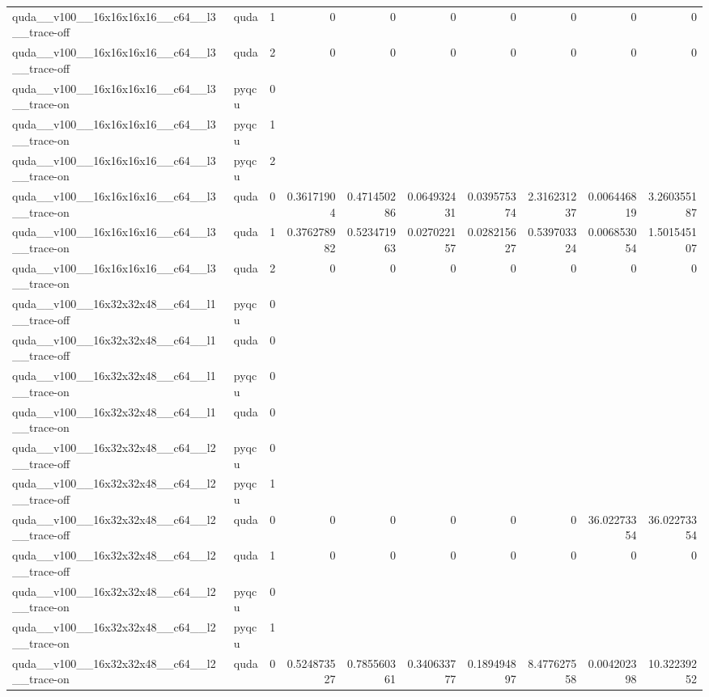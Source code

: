 \begin{table}[htbp]
\begin{tabular}{@{}llrrrrrrrr@{}}
quda\_\_v100\_\_16x16x16x16\_\_c64\_\_l3\_\_trace-off & quda & 1 & 0 & 0 & 0 & 0 & 0 & 0 & 0 \\
quda\_\_v100\_\_16x16x16x16\_\_c64\_\_l3\_\_trace-off & quda & 2 & 0 & 0 & 0 & 0 & 0 & 0 & 0 \\
quda\_\_v100\_\_16x16x16x16\_\_c64\_\_l3\_\_trace-on & pyqcu & 0 &  &  &  &  &  &  &  \\
quda\_\_v100\_\_16x16x16x16\_\_c64\_\_l3\_\_trace-on & pyqcu & 1 &  &  &  &  &  &  &  \\
quda\_\_v100\_\_16x16x16x16\_\_c64\_\_l3\_\_trace-on & pyqcu & 2 &  &  &  &  &  &  &  \\
quda\_\_v100\_\_16x16x16x16\_\_c64\_\_l3\_\_trace-on & quda & 0 & 0.36171904 & 0.471450286 & 0.064932431 & 0.039575374 & 2.316231237 & 0.006446819 & 3.260355187 \\
quda\_\_v100\_\_16x16x16x16\_\_c64\_\_l3\_\_trace-on & quda & 1 & 0.376278982 & 0.523471963 & 0.027022157 & 0.028215627 & 0.539703324 & 0.006853054 & 1.501545107 \\
quda\_\_v100\_\_16x16x16x16\_\_c64\_\_l3\_\_trace-on & quda & 2 & 0 & 0 & 0 & 0 & 0 & 0 & 0 \\
quda\_\_v100\_\_16x32x32x48\_\_c64\_\_l1\_\_trace-off & pyqcu & 0 &  &  &  &  &  &  &  \\
quda\_\_v100\_\_16x32x32x48\_\_c64\_\_l1\_\_trace-off & quda & 0 &  &  &  &  &  &  &  \\
quda\_\_v100\_\_16x32x32x48\_\_c64\_\_l1\_\_trace-on & pyqcu & 0 &  &  &  &  &  &  &  \\
quda\_\_v100\_\_16x32x32x48\_\_c64\_\_l1\_\_trace-on & quda & 0 &  &  &  &  &  &  &  \\
quda\_\_v100\_\_16x32x32x48\_\_c64\_\_l2\_\_trace-off & pyqcu & 0 &  &  &  &  &  &  &  \\
quda\_\_v100\_\_16x32x32x48\_\_c64\_\_l2\_\_trace-off & pyqcu & 1 &  &  &  &  &  &  &  \\
quda\_\_v100\_\_16x32x32x48\_\_c64\_\_l2\_\_trace-off & quda & 0 & 0 & 0 & 0 & 0 & 0 & 36.02273354 & 36.02273354 \\
quda\_\_v100\_\_16x32x32x48\_\_c64\_\_l2\_\_trace-off & quda & 1 & 0 & 0 & 0 & 0 & 0 & 0 & 0 \\
quda\_\_v100\_\_16x32x32x48\_\_c64\_\_l2\_\_trace-on & pyqcu & 0 &  &  &  &  &  &  &  \\
quda\_\_v100\_\_16x32x32x48\_\_c64\_\_l2\_\_trace-on & pyqcu & 1 &  &  &  &  &  &  &  \\
quda\_\_v100\_\_16x32x32x48\_\_c64\_\_l2\_\_trace-on & quda & 0 & 0.524873527 & 0.785560361 & 0.340633777 & 0.189494897 & 8.477627558 & 0.004202398 & 10.32239252 \\

\end{tabular}
\end{table}
